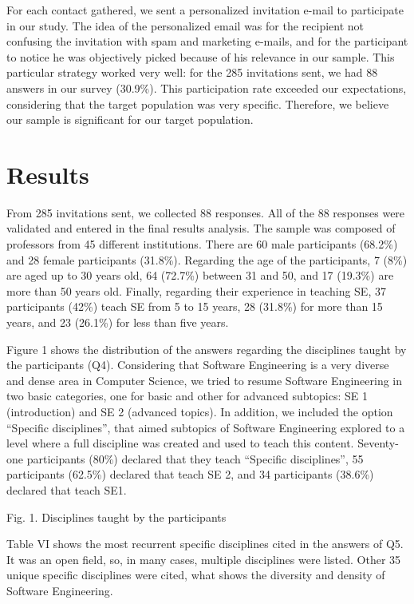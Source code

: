 For each contact gathered, we sent a personalized invitation e-mail to participate in our study. The idea of the personalized email was for the recipient not confusing the invitation with spam and marketing e-mails, and for the participant to notice he was objectively picked because of his relevance in our sample. This particular strategy worked very well: for the 285 invitations sent, we had 88 answers in our survey (30.9\%). This participation rate exceeded our expectations, considering that the target population was very specific. Therefore, we believe our sample is significant for our target population.

\section{Results}

From 285 invitations sent, we collected 88 responses. All of the 88 responses were validated and entered in the final results analysis. The sample was composed of professors from 45 different institutions. There are 60 male participants (68.2\%) and 28 female participants (31.8\%). Regarding the age of the participants, 7 (8\%) are aged up to 30 years old, 64 (72.7\%) between 31 and 50, and 17 (19.3\%) are more than 50 years old. Finally, regarding their experience in teaching SE, 37 participants (42\%) teach SE from 5 to 15 years, 28 (31.8\%) for more than 15 years, and 23 (26.1\%) for less than five years.

Figure 1 shows the distribution of the answers regarding the disciplines taught by the participants (Q4). Considering that Software Engineering is a very diverse and dense area in Computer Science, we tried to resume Software Engineering in two basic categories, one for basic and other for advanced subtopics: SE 1 (introduction) and SE 2 (advanced topics). In addition, we included the option “Specific disciplines”, that aimed subtopics of Software Engineering explored to a level where a full discipline was created and used to teach this content. Seventy-one participants (80\%) declared that they teach “Specific disciplines”, 55 participants (62.5\%) declared that teach SE 2, and 34 participants (38.6\%) declared that teach SE1. 
 
Fig. 1. Disciplines taught by the participants

Table VI shows the most recurrent specific disciplines cited in the answers of Q5. It was an open field, so, in many cases, multiple disciplines were listed. Other 35 unique specific disciplines were cited, what shows the diversity and density of Software Engineering.


